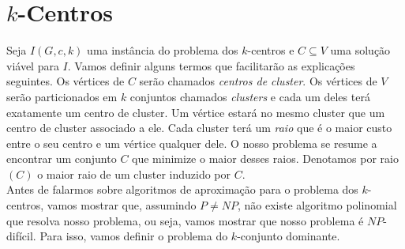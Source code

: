 \documentclass[12pt]{article}
\newcommand{\NP}{\mathit{NP}}
\begin{document}



\newpage
\section{$k$-Centros}

Seja $I(G,c,k)$ uma instância do problema dos $k$-centros e $C \subseteq V$ uma solução viável para $I$. Vamos definir alguns termos que facilitarão as explicações seguintes. Os vértices de $C$ serão chamados \emph{centros de cluster}. Os vértices de $V$ serão particionados em $k$ conjuntos chamados \emph{clusters} e cada um deles terá exatamente um centro de cluster. Um vértice estará no mesmo cluster que um centro de cluster associado a ele. Cada cluster terá um \emph{raio} que é o maior custo entre o seu centro e um vértice qualquer dele. O nosso problema se resume a encontrar um conjunto $C$ que minimize o maior desses raios. Denotamos por raio$(C)$ o maior raio de um cluster induzido por $C$.\\
Antes de falarmos sobre algoritmos de aproximação para o problema dos $k$-centros, vamos mostrar que, assumindo $P\neq\NP$, não existe algoritmo polinomial que resolva nosso problema, ou seja, vamos mostrar que nosso problema é $\NP$-difícil. Para isso, vamos definir o problema do $k$-conjunto dominante.
\end{document}
